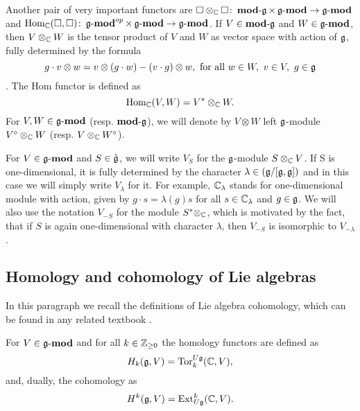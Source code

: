 Another pair of very important functors are $\square \otimes_{\mathbb{C}} \square \colon \operatorname{\mathbf{mod-\mathfrak{g}}} \times
\operatorname{\mathbf{\mathfrak{g}-mod}} \to \operatorname{\mathbf{\mathfrak{g}-mod}}$ and $\operatorname{Hom}_{\mathbb{C}}(\square, \square)\colon \operatorname{\mathbf{\mathfrak{g}-mod}}^{op} \times
\operatorname{\mathbf{\mathfrak{g}-mod}} \to \operatorname{\mathbf{\mathfrak{g}-mod}}$. If $V \in \operatorname{\mathbf{mod-\mathfrak{g}}}$ and $W \in \operatorname{\mathbf{\mathfrak{g}-mod}}$, then $V \otimes_{\mathbb{C}} W$
is the tensor product of $V$ and $W$ as vector space with action of $\mathfrak{g}$, fully determined by the
formula
\[
    g\cdot v\otimes w = v\otimes (g\cdot w) - (v\cdot g) \otimes w, \text{ for all } w\in W,~v\in
    V,~ g\in \mathfrak{g} 
\].
The Hom functor is defined as 
\[
    \operatorname{Hom}_{\mathbb{C}}(V, W)=V^* \otimes_{\mathbb{C}} W.
\]
For $V, W \in \operatorname{\mathbf{\mathfrak{g}-mod}}$ (resp. $\operatorname{\mathbf{mod-\mathfrak{g}}}$), we will denote by $V\otimes W$ left $\mathfrak{g}$-module
$V^\circ \otimes_{\mathbb{C}} W$ (resp. $V \otimes_{\mathbb{C}} W^\circ$).

For $V\in \operatorname{\mathbf{\mathfrak{g}-mod}}$ and $S \in \hat{\mathfrak{g}}$, we will write $V_{S}$ for the $\mathfrak{g}$-module $S\otimes_{\mathbb{C}} V$. 
If S is one-dimensional, it is fully determined by the character $\lambda \in (\mathfrak{g}/[\mathfrak{g},
\mathfrak{g}])$ and in this case we will simply write $V_\lambda$ for it. For example, $\mathbb{C}_\lambda$
stands for one-dimensional module with action, given by $g\cdot s = \lambda(g)s$ for all $s\in
\mathbb{C}_\lambda$ and $g \in \mathfrak{g}$. We will also use the notation $V_{-S}$ for the module $S^*
\otimes_{\mathbb{C}}$, which is motivated by the fact, that if $S$ is again one-dimensional with character
$\lambda$, then $V_{-S}$ is isomorphic to $V_{-\lambda}$. 

\subsection{Homology and cohomology of Lie algebras}
In this paragraph we recall the definitions of Lie algebra cohomology, which can be found in any
related textbook .


\begin{definition}
    For $V\in \operatorname{\mathbf{\mathfrak{g}-mod}}$ and for all $k\in \mathbb{Z}_{\geq0}$ the homology functors are defined as 
    \begin{equation}
        H_k(\mathfrak{g}, V) = \mathrm{Tor}_k^{U\mathfrak{g}}(\mathbb{C}, V),
    \end{equation}
    and, dually, the cohomology as
    \begin{equation}
        H^k(\mathfrak{g}, V) = \operatorname{Ext}^k_{U\mathfrak{g}}(\mathbb{C}, V).
    \end{equation}
\end{definition}

